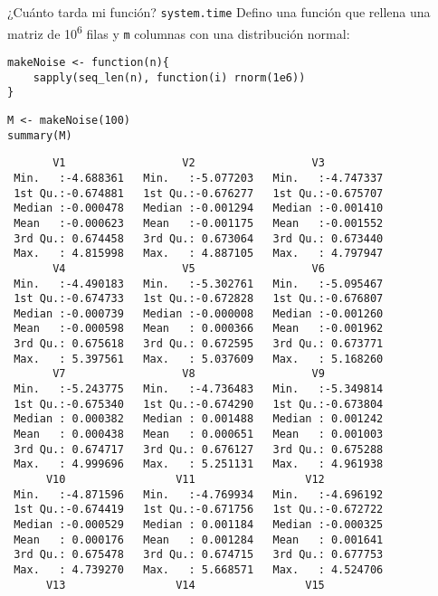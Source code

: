 \documentclass[xcolor={usenames,svgnames,dvipsnames}]{beamer}
\begin{document}
\begin{frame}[label={sec:orga833b1a},fragile]{¿Cuánto tarda mi función? \texttt{system.time}}
 Defino una función que rellena una matriz de 10\textsuperscript{6} filas y \texttt{m} columnas con una distribución normal:
\lstset{language=r,label= ,caption= ,captionpos=b,numbers=none}
\begin{lstlisting}
makeNoise <- function(n){
    sapply(seq_len(n), function(i) rnorm(1e6))
}
\end{lstlisting}

\lstset{language=r,label= ,caption= ,captionpos=b,numbers=none}
\begin{lstlisting}
M <- makeNoise(100)
summary(M)
\end{lstlisting}

\begin{verbatim}
       V1                  V2                  V3           
 Min.   :-4.688361   Min.   :-5.077203   Min.   :-4.747337  
 1st Qu.:-0.674881   1st Qu.:-0.676277   1st Qu.:-0.675707  
 Median :-0.000478   Median :-0.001294   Median :-0.001410  
 Mean   :-0.000623   Mean   :-0.001175   Mean   :-0.001552  
 3rd Qu.: 0.674458   3rd Qu.: 0.673064   3rd Qu.: 0.673440  
 Max.   : 4.815998   Max.   : 4.887105   Max.   : 4.797947  
       V4                  V5                  V6           
 Min.   :-4.490183   Min.   :-5.302761   Min.   :-5.095467  
 1st Qu.:-0.674733   1st Qu.:-0.672828   1st Qu.:-0.676807  
 Median :-0.000739   Median :-0.000008   Median :-0.001260  
 Mean   :-0.000598   Mean   : 0.000366   Mean   :-0.001962  
 3rd Qu.: 0.675618   3rd Qu.: 0.672595   3rd Qu.: 0.673771  
 Max.   : 5.397561   Max.   : 5.037609   Max.   : 5.168260  
       V7                  V8                  V9           
 Min.   :-5.243775   Min.   :-4.736483   Min.   :-5.349814  
 1st Qu.:-0.675340   1st Qu.:-0.674290   1st Qu.:-0.673804  
 Median : 0.000382   Median : 0.001488   Median : 0.001242  
 Mean   : 0.000438   Mean   : 0.000651   Mean   : 0.001003  
 3rd Qu.: 0.674717   3rd Qu.: 0.676127   3rd Qu.: 0.675288  
 Max.   : 4.999696   Max.   : 5.251131   Max.   : 4.961938  
      V10                 V11                 V12           
 Min.   :-4.871596   Min.   :-4.769934   Min.   :-4.696192  
 1st Qu.:-0.674419   1st Qu.:-0.671756   1st Qu.:-0.672722  
 Median :-0.000529   Median : 0.001184   Median :-0.000325  
 Mean   : 0.000176   Mean   : 0.001284   Mean   : 0.001641  
 3rd Qu.: 0.675478   3rd Qu.: 0.674715   3rd Qu.: 0.677753  
 Max.   : 4.739270   Max.   : 5.668571   Max.   : 4.524706  
      V13                 V14                 V15           

\end{verbatim}
\end{frame}
\end{document}

